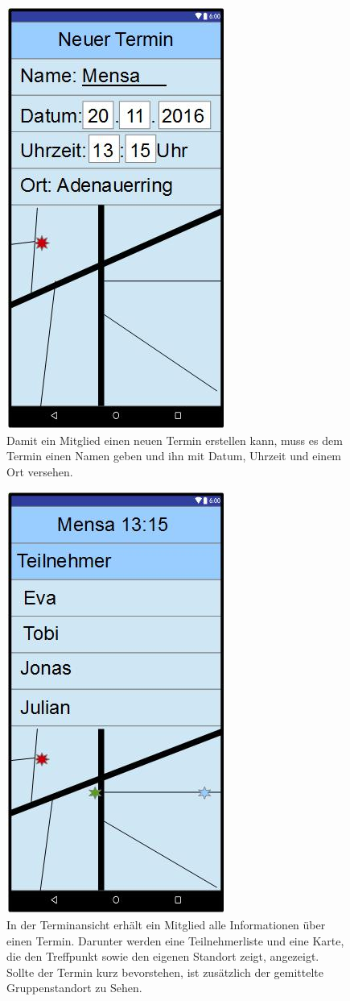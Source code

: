 \documentclass{scrartcl}
\begin{document}
	\newpage
	\begin{figure}[h]
		\centering
		\includegraphics[width=.5\textwidth]{GUI_NeuerTermin.jpg}
		\caption{Damit ein \gls{Mitglied} einen neuen Termin erstellen kann, muss es dem Termin einen Namen geben und ihn mit Datum, Uhrzeit und einem Ort versehen.}
	\end{figure}
	
	\newpage
	\begin{figure}[h]
		\centering
		\includegraphics[width=.5\textwidth]{GUI_Termin.jpg}
		\caption{In der Terminansicht erhält ein \gls{Mitglied} alle Informationen über einen Termin. Darunter werden eine Teilnehmerliste und eine Karte, die den Treffpunkt sowie den eigenen Standort zeigt, angezeigt. Sollte der Termin kurz bevorstehen, ist zusätzlich der gemittelte Gruppenstandort zu Sehen.}
	\end{figure}
	
	
\newpage
	


\appendix
%
%
\printindex
\glsaddall
\printglossaries
	
\end{document}

